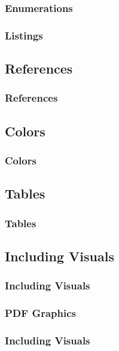 {\begin{frame}[fragile]
\end{frame}

\subsubsection{Enumerations}
\begin{frame}[fragile]
  \frametitle{Listings }
  \vspace{3mm}
  
\end{frame}

\subsection{References}
\begin{frame}[fragile]
  \frametitle{References}
  \vspace{3mm}
  
\end{frame}

\subsection{Colors}
\begin{frame}[fragile]
  \frametitle{Colors}
  \vspace{3mm}
  
\end{frame}

\subsection{Tables}
\begin{frame}[fragile]
  \frametitle{Tables}
  \vspace{3mm}
  
\end{frame}

\subsection{Including Visuals}
\begin{frame}[fragile]
  \frametitle{Including Visuals}
  \vspace{3mm}
  
\end{frame}

\subsubsection{PDF Graphics}
\begin{frame}[fragile]
  \frametitle{Including Visuals }
  \vspace{3mm}
  

\end{frame}}
